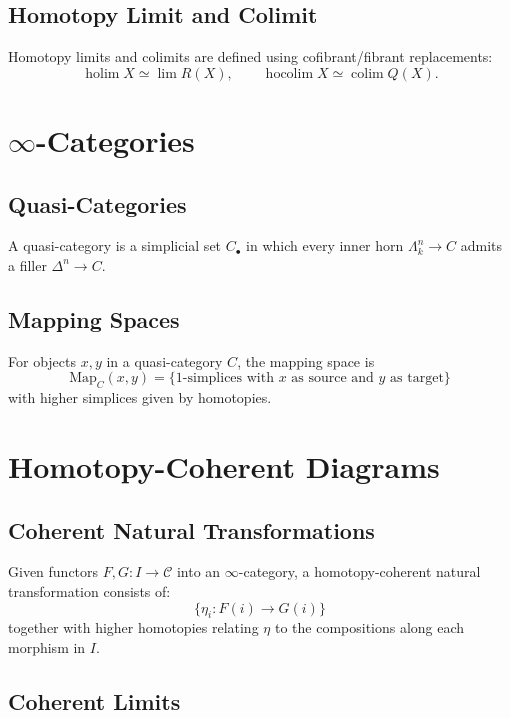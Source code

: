 \subsection{Homotopy Limit and Colimit}

Homotopy limits and colimits are defined using cofibrant/fibrant replacements:
\[
\operatorname{holim} X \simeq \lim R(X),
\qquad
\operatorname{hocolim} X \simeq \operatorname{colim} Q(X).
\]

\section{\texorpdfstring{$\infty$}{∞}-Categories}

\subsection{Quasi-Categories}

A quasi-category is a simplicial set $C_\bullet$ in which every inner horn $\Lambda^n_k \to C$ admits a filler $\Delta^n\to C$.

\subsection{Mapping Spaces}

For objects $x,y$ in a quasi-category $C$, the mapping space is
\[
\mathrm{Map}_C(x,y)
  = \{ \text{1-simplices with $x$ as source and $y$ as target} \}
\]
with higher simplices given by homotopies.

\section{Homotopy-Coherent Diagrams}

\subsection{Coherent Natural Transformations}

Given functors $F,G: I \to \mathcal{C}$ into an $\infty$-category, a homotopy-coherent natural transformation consists of:
\[
\{\eta_i : F(i)\to G(i)\}
\]
together with higher homotopies relating $\eta$ to the compositions along each morphism in $I$.

\subsection{Coherent Limits}

